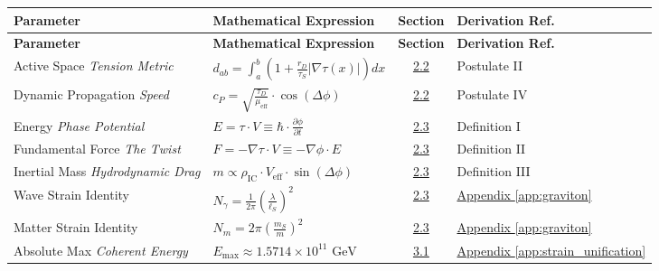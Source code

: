 \begin{longtable}{@{} p{4.5cm} p{6cm} c p{4cm} @{}}
\toprule
\textbf{Parameter} & \textbf{Mathematical Expression} & \textbf{Section} & \textbf{Derivation Ref.} \\
\midrule
\endfirsthead

\toprule
\textbf{Parameter} & \textbf{Mathematical Expression} & \textbf{Section} & \textbf{Derivation Ref.} \\
\midrule
\endhead

Active Space \newline \textit{Tension Metric} & $d_{ab} = \int_a^b \left( 1 + \frac{r_D}{\tau_S} |\nabla\tau(x)| \right) dx$ & \hyperref[sec:2.2]{2.2} & Postulate II \\

Dynamic Propagation \newline \textit{Speed} & $c_P = \sqrt{\frac{\tau_D}{\mu_{\text{eff}}}} \cdot \cos(\Delta\phi)$ & \hyperref[sec:2.2]{2.2} & Postulate IV \\

Energy \newline \textit{Phase Potential} & $E = \tau \cdot V \equiv \hbar \cdot \frac{\partial\phi}{\partial t}$ & \hyperref[sec:2.3]{2.3} & Definition I \\

Fundamental Force \newline \textit{The Twist} & $F = -\nabla\tau \cdot V \equiv -\nabla\phi \cdot E$ & \hyperref[sec:2.3]{2.3} & Definition II \\

Inertial Mass \newline \textit{Hydrodynamic Drag} & $m \propto \rho_{\text{IC}} \cdot V_{\text{eff}} \cdot \sin(\Delta\phi)$ & \hyperref[sec:2.3]{2.3} & Definition III \\

Wave Strain Identity & $N_\gamma = \frac{1}{2\pi} \left(\frac{\lambda}{\ell_S}\right)^2$ & \hyperref[sec:2.3]{2.3} & \hyperref[app:graviton]{Appendix \ref*{app:graviton}} \\

Matter Strain Identity & $N_m = 2\pi\left(\frac{m_S}{m}\right)^2$ & \hyperref[sec:2.3]{2.3} & \hyperref[app:graviton]{Appendix \ref*{app:graviton}} \\

Absolute Max \newline \textit{Coherent Energy} & $E_{\text{max}} \approx 1.5714 \times 10^{11} \text{ GeV}$ & \hyperref[sec:3.1]{3.1} & \hyperref[app:strain_unification]{Appendix \ref*{app:strain_unification}} \\


\end{longtable}
